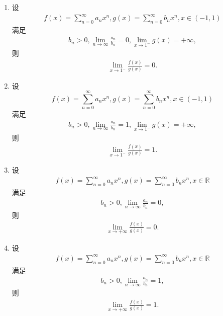 \documentclass[../../main.tex]{subfiles}
\begin{document}
\begin{theorem}[幂级数系数的阶蕴含幂级数和函数的阶]\label{theorem:幂级数系数的阶蕴含幂级数和函数的阶}
\begin{enumerate}[(1)]
\item 设
\begin{align}
f(x) = \sum_{n=0}^{\infty} a_n x^n, g(x) = \sum_{n=0}^{\infty} b_n x^n, x \in (-1,1)
\end{align}
满足
\begin{align}
b_n > 0, \lim_{n \to \infty} \frac{a_n}{b_n} = 0, \lim_{x \to 1^-} g(x) = +\infty, \label{eq::::--::--12301749-EQ:13---92788648184FDAG..1}
\end{align}
则
\begin{align}
\lim_{x \to 1^-} \frac{f(x)}{g(x)} = 0. \label{eq::::--::--12301349-EQ:13---92788648184FDAG..1}
\end{align}

\item 设
\[
f(x) = \sum_{n=0}^{\infty} a_n x^n, g(x) = \sum_{n=0}^{\infty} b_n x^n, x \in (-1,1)
\]
满足
\begin{align}
b_n > 0, \lim_{n \to \infty} \frac{a_n}{b_n} = 1, \lim_{x \to 1^-} g(x) = +\infty, \label{eq::::--::--123349-EQ:13---92788648184FDAG..1}
\end{align}
则
\begin{align}
\lim_{x \to 1^-} \frac{f(x)}{g(x)} = 1. \label{eq::::--::--1233241449-EQ:13---92788648184FDAG..1}
\end{align}

\item 设
\begin{align}
f(x) = \sum_{n=0}^{\infty} a_n x^n, g(x) = \sum_{n=0}^{\infty} b_n x^n, x \in \mathbb{R}
\end{align}
满足
\begin{align}
b_n > 0, \lim_{n \to \infty} \frac{a_n}{b_n} = 0, \label{eq::::--::-2341233241449-EQ:13---92788648184FDAG..1}
\end{align}
则
\begin{align}
\lim_{x \to +\infty} \frac{f(x)}{g(x)} = 0. \label{eq::::--::-233241449-EQ:13---92788648184FDAG..1}
\end{align}

\item 设
\begin{align}
f(x) = \sum_{n=0}^{\infty} a_n x^n, g(x) = \sum_{n=0}^{\infty} b_n x^n, x \in \mathbb{R}
\end{align}
满足
\begin{align}
b_n > 0, \lim_{n \to \infty} \frac{a_n}{b_n} = 1, \label{eq::::--::-23412332449-EQ:13---92788648184FDAG..1}
\end{align}
则
\begin{align}
\lim_{x \to +\infty} \frac{f(x)}{g(x)} = 1. \label{eq::::--::-2332419-EQ:13---92788648184FDAG..1}
\end{align}
\end{enumerate}
\end{theorem}
\end{document}
